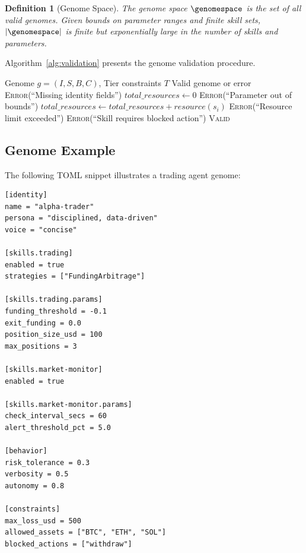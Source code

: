 \documentclass{article}
\newtheorem{definition}[theorem]{Definition}
\begin{document}
\begin{definition}[Genome Space]
The genome space $\genomespace$ is the set of all valid genomes. Given bounds on parameter ranges and finite skill sets, $|\genomespace|$ is finite but exponentially large in the number of skills and parameters.
\end{definition}

Algorithm~\ref{alg:validation} presents the genome validation procedure.

\begin{algorithm}[t]
\caption{Genome Validation}
\label{alg:validation}
\begin{algorithmic}[1]
\Require Genome $g = (I, S, B, C)$, Tier constraints $T$
\Ensure Valid genome or error
        \State \Return \textsc{Error}(``Missing identity fields'')
    \EndIf
    \State $total\_resources \gets 0$
                    \State \Return \textsc{Error}(``Parameter out of bounds'')
                \EndIf
            \EndFor
            \State $total\_resources \gets total\_resources + resource(s_i)$
        \EndIf
    \EndFor
        \State \Return \textsc{Error}(``Resource limit exceeded'')
    \EndIf
        \State \Return \textsc{Error}(``Skill requires blocked action'')
    \EndIf
    \State \Return \textsc{Valid}
\EndFunction
\end{algorithmic}
\end{algorithm}

\subsection{Genome Example}

The following TOML snippet illustrates a trading agent genome:

\begin{lstlisting}[style=tomlcode, caption={Example genome for a trading agent}]
[identity]
name = "alpha-trader"
persona = "disciplined, data-driven"
voice = "concise"

[skills.trading]
enabled = true
strategies = ["FundingArbitrage"]

[skills.trading.params]
funding_threshold = -0.1
exit_funding = 0.0
position_size_usd = 100
max_positions = 3

[skills.market-monitor]
enabled = true

[skills.market-monitor.params]
check_interval_secs = 60
alert_threshold_pct = 5.0

[behavior]
risk_tolerance = 0.3
verbosity = 0.5
autonomy = 0.8

[constraints]
max_loss_usd = 500
allowed_assets = ["BTC", "ETH", "SOL"]
blocked_actions = ["withdraw"]
\end{lstlisting}
\end{document}
